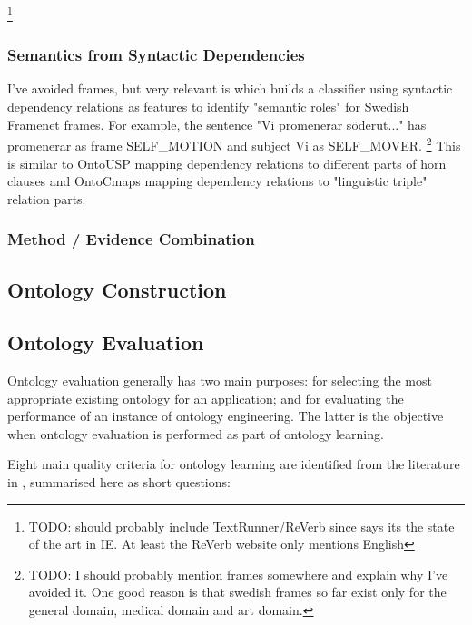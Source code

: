 \documentclass[a4paper]{report}
\newcommand{\todo}[1]{\footnote{{\color{red} TODO: #1}}}
\begin{document}
\todo{should probably include TextRunner/ReVerb since \cite{Poon2010OntoUSP} says its the state of the art in IE. At least the ReVerb website only mentions English}

\subsubsection{Semantics from Syntactic Dependencies}

I've avoided frames, but very relevant is \cite{JohanssonEtAl12RoleFrame} which builds a classifier using syntactic dependency relations as features to identify "semantic roles" for Swedish Framenet frames.
For example, the sentence "Vi promenerar s\"{o}derut..." has promenerar as frame SELF\_MOTION and subject Vi as SELF\_MOVER.
\todo{I should probably mention frames somewhere and explain why I've avoided it.
  One good reason is that swedish frames so far exist only for the general domain, medical domain and art domain\cite{JohanssonEtAl12RoleFrame}.}
This is similar to OntoUSP mapping dependency relations to different parts of horn clauses and OntoCmaps mapping dependency relations to "linguistic triple" relation parts.

\subsubsection{Method / Evidence Combination}

\subsection{Ontology Construction}

\subsection{Ontology Evaluation}
\label{sec:background:eval}
Ontology evaluation generally has two main purposes: for selecting the most appropriate existing ontology for an application; and for evaluating the performance of an instance of ontology engineering.
The latter is the objective when ontology evaluation is performed as part of ontology learning.

Eight main quality criteria for ontology learning are identified from the literature in \cite{HOO2009OntEval}, summarised here as short questions:
\end{document}
